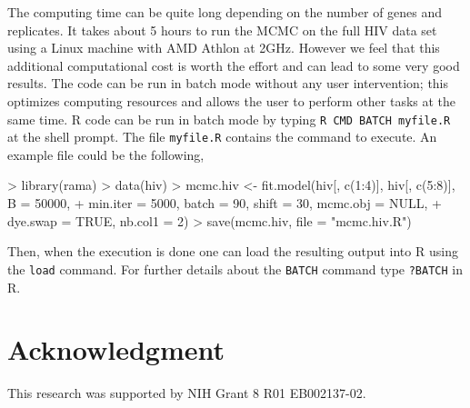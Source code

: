\documentclass[11pt]{article}
\begin{document}
The computing time can be quite long depending on the number of genes and replicates. 
It takes about 5 hours to run the MCMC on the full HIV data set using a Linux machine with AMD Athlon at 2GHz. 
However we feel that this additional computational cost is 
worth the effort and can lead to some very good results. 
The code can be run in batch mode without any user intervention; this optimizes 
computing resources and allows the user to perform other tasks at the same time. 
R code can be run in batch mode by typing {\tt R CMD BATCH myfile.R} 
at the shell prompt. The file {\tt myfile.R} contains the command to execute.
An example file could be the following,
\begin{Schunk}
\begin{Sinput}
> library(rama)
> data(hiv)
> mcmc.hiv <- fit.model(hiv[, c(1:4)], hiv[, c(5:8)], B = 50000, 
+     min.iter = 5000, batch = 90, shift = 30, mcmc.obj = NULL, 
+     dye.swap = TRUE, nb.col1 = 2)
> save(mcmc.hiv, file = "mcmc.hiv.R")
\end{Sinput}
\end{Schunk}
Then, when the execution is done one can load the resulting output into R using the {\tt load} command. For further details about the {\tt BATCH} command type {\tt ?BATCH} in R.\\

\section{Acknowledgment}
This research was supported by NIH Grant 8 R01 EB002137-02.



 

\end{document}
